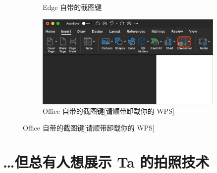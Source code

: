 \documentclass[11pt, fontset = fandol, dvipdfmx]{ctexart}
\begin{document}
\begin{figure}[htbp]
\begin{subfigure}{.48\linewidth}
    \caption{Edge 自带的截图键}
  \end{subfigure}
  \hspace*{\fill}
  \begin{subfigure}{.48\linewidth}
    \centering
    \includegraphics[width = .96\linewidth]{Office}
    \caption{Office 自带的截图键[请顺带卸载你的 WPS]}
  \end{subfigure}
\end{figure}

\section*{\ldots 但总有人想展示 Ta 的拍照技术}
\end{document}
